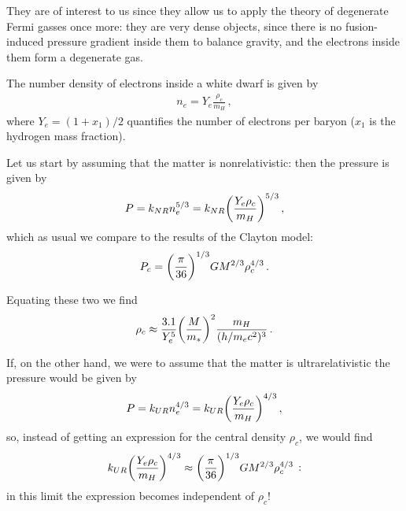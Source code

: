 \documentclass[main.tex]{subfiles}
\begin{document}
They are of interest to us since they allow us to apply the theory of degenerate Fermi gasses once more: they are very dense objects, since there is no fusion-induced pressure gradient inside them to balance gravity, and the electrons inside them form a degenerate gas.

The number density of electrons inside a white dwarf is given by
%
\begin{align}
  n_e = Y_{e} \frac{\rho_{c}}{m_H}
\,,
\end{align}
%
where \(Y_e = (1 + x_1) /2\) quantifies the number of electrons per baryon (\(x_1 \) is the hydrogen mass fraction).


Let us start by assuming that the matter is nonrelativistic: then  
the pressure is given by
%
\begin{align}
  P = k_{NR} n_e^{5/3} = k_{NR} \qty(\frac{Y_e \rho_{c}}{m_H})^{5/3}
\,,
\end{align}
%
which as usual we compare to the results of the Clayton model:
%
\begin{align}
  P_c = \qty(\frac{\pi }{36})^{1/3} G M^{2/3} \rho_{c}^{4/3}
\,.
\end{align}

Equating these two we find
%
\begin{align}
  \rho_{c} \approx \frac{\num{3.1}}{Y_e^{5}} \qty(\frac{M}{m_{*}})^2 \frac{m_H}{(h / m_e c^2)^{3}}
\,.
\end{align}


If, on the other hand, we were to assume that the matter is ultrarelativistic the pressure would be given by
%
\begin{align}
P = k_{UR} n_e^{4/3} 
= k_{UR}\qty(\frac{Y_e \rho_{c}}{m_H})^{4/3}
\,,
\end{align}
%
so, instead of getting an expression for the central density \(\rho _c\), we would find
%
\begin{align}
  k_{UR} \qty(\frac{Y_e \rho_{c}}{m_H})^{4/3} \approx 
  \qty(\frac{\pi }{36})^{1/3} G M^{2/3} \rho_{c}^{4/3}
\,:
\end{align}
%
in this limit the expression becomes independent of \(\rho_{c}\)!
\end{document}
